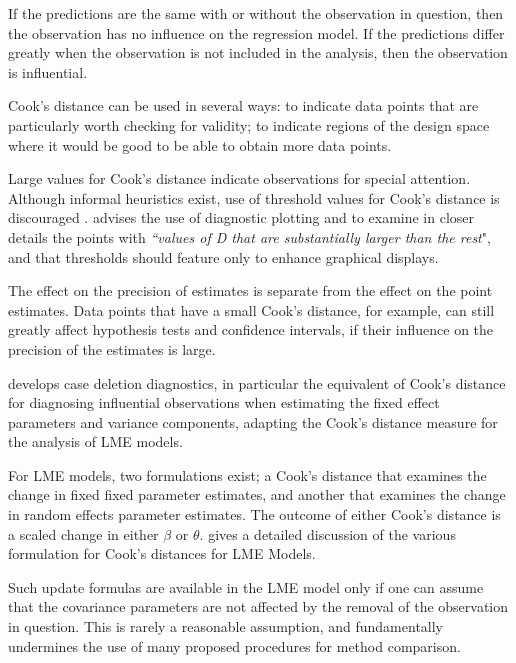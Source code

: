 \documentclass[12pt, a4paper]{report}
\theoremstyle{definition}
\theoremstyle{remark}
\begin{document}
If the predictions are the same with or without the observation in question, then the observation has no influence on the regression model. If the predictions differ greatly when the observation is not included in the analysis, then the observation is influential.

 Cook's distance can be used in several ways: to indicate data points that are particularly worth checking for validity; to indicate regions of the design space where it would be good to be able to obtain more data points.


Large values for Cook's distance indicate observations for special attention. Although informal heuristics exist, use of threshold values for Cook's distance is discouraged \citep{fox1991}. \citet{fox1991} advises the use of diagnostic plotting and to examine in closer details the points with \textit{``values of D that are substantially larger than the rest}", and that thresholds should feature only to enhance graphical displays.

The effect on the precision of estimates is separate from the effect on the point estimates. Data points that have a small Cook's distance, for example, can still greatly affect hypothesis tests and confidence intervals, if their  influence on the precision of the estimates is large.

\citet{Christensen} develops  case deletion diagnostics, in particular the equivalent of  Cook's distance for diagnosing influential observations when estimating the fixed effect parameters and variance components, adapting the Cook's distance measure for the analysis of LME models. 

For LME models, two formulations exist; a Cook's distance that examines the change in fixed fixed parameter estimates, and another that examines the change in random effects parameter estimates. The outcome of either Cook's distance is a scaled change in either $\beta$ or $\theta$. \citet{Zewotir} gives a detailed discussion of the various formulation for Cook's distances for LME Models.

Such update formulas are available in the LME model only if one can assume that the covariance parameters are not affected by the removal of the observation in question. This is rarely a reasonable assumption, and fundamentally undermines the use of many proposed procedures for method comparison.
\end{document}

